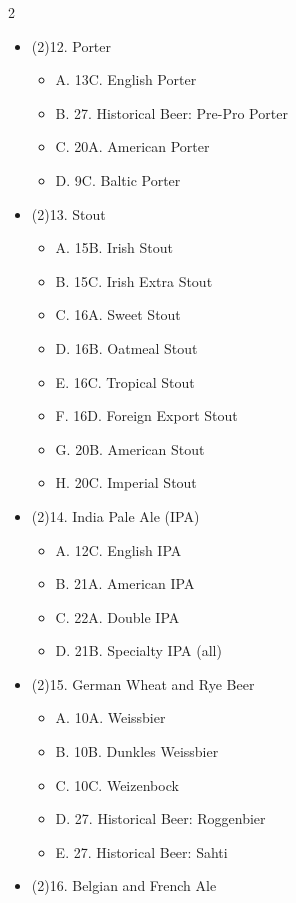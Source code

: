 \begin{multicols*}{2}
\begin{itemize}[noitemsep]
\begin{itemize}
  \item[] B. 27. Historical Beer: London Brown Ale
  \item[] C. 13B. British Brown Ale
\end{itemize}
\item[] (2)12. Porter
\begin{itemize}
  \item[] A. 13C. English Porter
  \item[] B. 27. Historical Beer: Pre-Pro Porter
  \item[] C. 20A. American Porter
  \item[] D. 9C. Baltic Porter
\end{itemize}
\item[] (2)13. Stout
\begin{itemize}
  \item[] A. 15B. Irish Stout
  \item[] B. 15C. Irish Extra Stout
  \item[] C. 16A. Sweet Stout
  \item[] D. 16B. Oatmeal Stout
  \item[] E. 16C. Tropical Stout
  \item[] F. 16D. Foreign Export Stout
  \item[] G. 20B. American Stout
  \item[] H. 20C. Imperial Stout
\end{itemize}
\item[] (2)14. India Pale Ale (IPA)
\begin{itemize}
  \item[] A. 12C. English IPA
  \item[] B. 21A. American IPA
  \item[] C. 22A. Double IPA
  \item[] D. 21B. Specialty IPA (all)
\end{itemize}
\item[] (2)15. German Wheat and Rye Beer
\begin{itemize}
  \item[] A. 10A. Weissbier
  \item[] B. 10B. Dunkles Weissbier
  \item[] C. 10C. Weizenbock
  \item[] D. 27. Historical Beer: Roggenbier
  \item[] E. 27. Historical Beer: Sahti
\end{itemize}
\item[] (2)16. Belgian and French Ale
\begin{itemize}

\end{itemize}
\end{itemize}
\end{multicols*}
